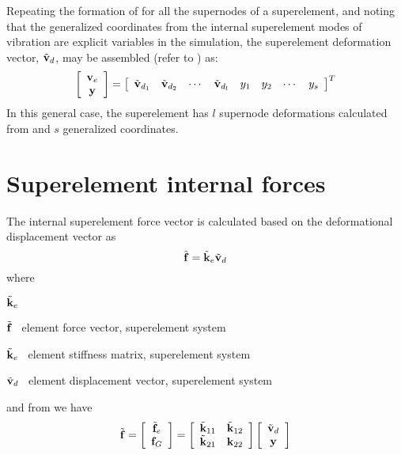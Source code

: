 {Repeating the formation of  for all the supernodes of a
superelement, and noting that the generalized coordinates from the internal
superelement modes of vibration are explicit variables in the simulation,
the superelement deformation vector, $\tilde{\bf v}_d$, may be assembled
(refer to ) as:
%
\begin{equation}
\left[\begin{array}{c} {\mf v}_e \\ {\mf y} \end{array} \right] =
\left[\begin{array}{*{20}c}
\tilde{\mf v}_{d_1} & \tilde{\mf v}_{d_2} & \cdots & \tilde{\mf v}_{d_l} &
y_1 & y_2 & \cdots & y_s
\end{array}\right]^T
\label{eqSC:supelDefDisp}
\end{equation}
%
In this general case, the superelement has $l$ supernode deformations
calculated from  and $s$ generalized coordinates.

\section{Superelement internal forces}
\label{sec:SupElIntForce}

The internal superelement force vector is calculated based on the deformational
displacement vector as
%
\begin{equation}
\tilde{\bf f} = \tilde{\bf k}_e \tilde{\bf v}_d
\label{eqSC:forceLocal}
\end{equation}
%
where
%
\begin{namelist}{$\tilde{\bf k}_e$}
\item[$\tilde{\bf f}$]   \mdash~element force vector, superelement system
\item[$\tilde{\bf k}_e$] \mdash~element stiffness matrix, superelement system
\item[$\tilde{\bf v}_d$] \mdash~element displacement vector, superelement system
\end{namelist}
%
and from  we have
%
\begin{equation}
\tilde{\bf f} = \left[\begin{array}{c}
\tilde{\bf f}_e \\ {\bf f}_G
\end{array}\right] = \left[\begin{array}{cc}
\tilde{\bf k}_{11} & \tilde{\bf k}_{12} \\
\tilde{\bf k}_{21} & {\bf k}_{22} \\
\end{array} \right] \left[\begin{array}{c}
\tilde{\bf v}_d \\ {\bf y} \end{array} \right]
\label{eqSC:forceFinal}
\end{equation}

}
